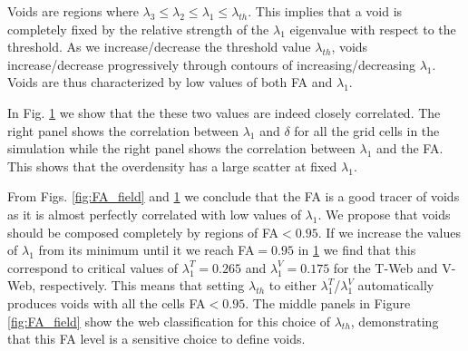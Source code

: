 \documentclass[a4,useAMS,usenatbib,usegraphicx]{mn2e}
\begin{document}
\begin{figure}
  
  \label{fig:L1_correlations}

\end{figure}


Voids are regions where $\lambda_3\leq\lambda_2\leq
\lambda_1\leq\lambda_{th}$. 
This implies that a void is completely fixed by the relative strength
of the $\lambda_1$ eigenvalue with respect to the threshold.   
As we increase/decrease the threshold value $\lambda_{th}$, voids
increase/decrease progressively through contours of
increasing/decreasing $\lambda_1$.  
Voids are thus characterized by low values of both FA and
$\lambda_1$.  

In Fig. \ref{fig:L1_correlations} we show that the these two values
are indeed closely correlated.  
The right panel shows the correlation between $\lambda_1$ and $\delta$ for
all the grid cells in the simulation while the right panel shows the
correlation between $\lambda_1$ and the FA. This shows that the
overdensity has a large scatter at fixed $\lambda_1$. 

From Figs. \ref{fig:FA_field} and \ref{fig:L1_correlations} we
conclude that the FA is a good tracer of voids as it is almost perfectly
correlated with low values of $\lambda_1$. 
We propose that voids should be composed completely by regions of
FA$<0.95$.
If we increase the values of $\lambda_1$ from its minimum until it
we reach FA$=0.95$ in \ref{fig:L1_correlations} we find that this
correspond to critical values of $\lambda_{1}^T = 0.265$ and
$\lambda_{1}^V = 0.175$ for the T-Web and V-Web, respectively.
This means that setting $\lambda_{th}$ to either
$\lambda_{1}^T$/$\lambda_{1}^{V}$ automatically produces voids with
all the cells FA$<0.95$.   
The middle panels in Figure \ref{fig:FA_field} show the web
classification for this choice of $\lambda_{th}$, demonstrating that
this FA level is a sensitive choice to define voids.
\end{document}
